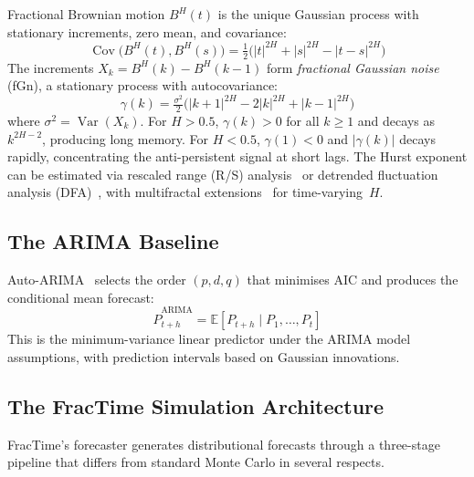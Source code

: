 \documentclass[12pt,a4paper]{article}
\begin{document}
Fractional Brownian motion $B^H(t)$ is the unique Gaussian process with
stationary increments, zero mean, and covariance:
\begin{equation}
  \operatorname{Cov}\bigl(B^H(t), B^H(s)\bigr) =
    \tfrac{1}{2}\bigl(|t|^{2H} + |s|^{2H} - |t-s|^{2H}\bigr)
  \label{eq:fbm_cov}
\end{equation}
The increments $X_k = B^H(k) - B^H(k-1)$ form \emph{fractional Gaussian
noise} (fGn), a stationary process with autocovariance:
\begin{equation}
  \gamma(k) = \tfrac{\sigma^2}{2}\bigl(|k+1|^{2H} - 2|k|^{2H}
              + |k-1|^{2H}\bigr)
  \label{eq:fgn_acov}
\end{equation}
where $\sigma^2 = \operatorname{Var}(X_k)$.  For $H > 0.5$, $\gamma(k) > 0$
for all $k \geq 1$ and decays as $k^{2H-2}$, producing long memory.  For
$H < 0.5$, $\gamma(1) < 0$ and $|\gamma(k)|$ decays rapidly, concentrating
the anti-persistent signal at short lags.  The Hurst exponent can be
estimated via rescaled range (R/S) analysis~\citep{Hurst1951} or
detrended fluctuation analysis (DFA)~\citep{Peng1994}, with multifractal
extensions~\citep{Kantelhardt2002} for time-varying~$H$.

\subsection{The ARIMA Baseline}

Auto-ARIMA~\citep{BoxJenkinsReinsel2015} selects the order $(p,d,q)$
that minimises AIC and produces the conditional mean forecast:
\begin{equation}
  \hat{P}_{t+h}^{\text{ARIMA}} =
    \mathbb{E}[P_{t+h} \mid P_1, \ldots, P_t]
  \label{eq:arima_forecast}
\end{equation}
This is the minimum-variance linear predictor under the ARIMA model
assumptions, with prediction intervals based on Gaussian innovations.

\subsection{The FracTime Simulation Architecture}
\label{sec:fractime_arch}

FracTime's forecaster generates distributional forecasts through a
three-stage pipeline that differs from standard Monte Carlo in several
respects.
\end{document}
